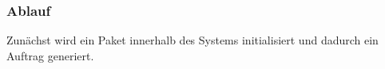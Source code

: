 \subsubsection{Ablauf}

Zunächst wird ein Paket innerhalb des Systems initialisiert und dadurch ein Auftrag generiert.
